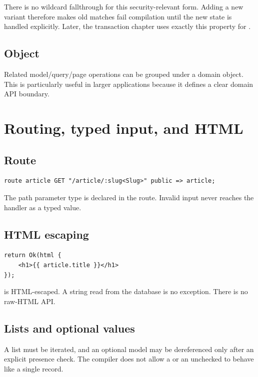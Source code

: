 There is no wildcard fallthrough for this security-relevant form. Adding a new variant therefore makes old matches fail compilation until the new state is handled explicitly. Later, the transaction chapter uses exactly this property for .

\subsection*{Object}

Related model/query/page operations can be grouped under a domain object. This is particularly useful in larger applications because it defines a clear domain API boundary.

\section{Routing, typed input, and HTML}

\subsection*{Route}

\begin{lstlisting}[language=RWLang]
route article GET "/article/:slug<Slug>" public => article;
\end{lstlisting}

The path parameter type is declared in the route. Invalid input never reaches the handler as a typed value.

\subsection*{HTML escaping}

\begin{lstlisting}[language=RWLang]
return Ok(html {
    <h1>{{ article.title }}</h1>
});
\end{lstlisting}

 is HTML-escaped. A string read from the database is no exception. There is no raw-HTML API.

\subsection*{Lists and optional values}

A list must be iterated, and an optional model may be dereferenced only after an explicit presence check. The compiler does not allow a  or an unchecked  to behave like a single record.

